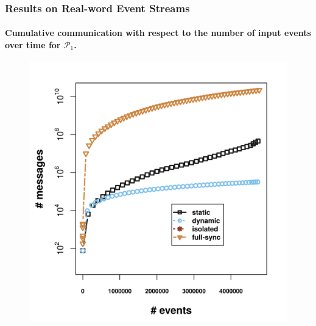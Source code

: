 \begin{frame}
	
	\frametitle{Results on Real-word Event Streams }
	\framesubtitle{Cumulative communication with respect to the number of input events over time for $\mathcal{P}_1$.}
	
	\begin{center}
		
		\begin{figure}[]
			\centering
			\includegraphics[width=.9\textwidth,height=.8\textheight]{../chapters/figures/synopses/new/messages_p1.png}
			
		\end{figure}
	\end{center}
	
\end{frame}


